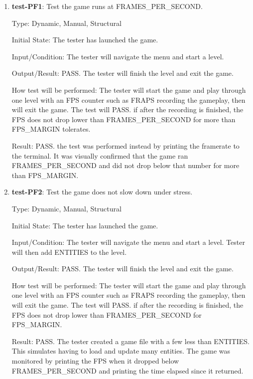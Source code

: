 \documentclass[12pt, titlepage]{article}
\begin{document}
\begin{enumerate}

\item{\textbf{test-PF1}: Test the game runs at FRAMES\_PER\_SECOND.\\}

Type: Dynamic, Manual, Structural
					
Initial State: The tester has launched the game.
					
Input/Condition: The tester will navigate the menu and start a level.
					
Output/Result: PASS. The tester will finish the level and exit the game.
					
How test will be performed: The tester will start the game and play through one level with an FPS counter such as FRAPS recording the gameplay, then will exit the game. The test will PASS. if after the recording is finished, the FPS does not drop lower than FRAMES\_PER\_SECOND for more than FPS\_MARGIN tolerates.

Result: PASS. the test was performed instead by printing the framerate to the terminal. It was visually confirmed that the game ran FRAMES\_PER\_SECOND and did not drop below that number for more than FPS\_MARGIN.

\item{\textbf{test-PF2}: Test the game does not slow down under stress.\\}

Type: Dynamic, Manual, Structural
					
Initial State: The tester has launched the game.
					
Input/Condition: The tester will navigate the menu and start a level. Tester will then add ENTITIES to the level.
					
Output/Result: PASS. The tester will finish the level and exit the game.
					
How test will be performed: The tester will start the game and play through one level with an FPS counter such as FRAPS recording the gameplay, then will exit the game. The test will PASS. if after the recording is finished, the FPS does not drop lower than FRAMES\_PER\_SECOND for FPS\_MARGIN.

Result: PASS. The tester created a game file with a few less than ENTITIES. This simulates having to load and update many entities. The game was monitored by printing the FPS when it dropped below FRAMES\_PER\_SECOND and printing the time elapsed since it returned.


\end{enumerate}
\end{document}
